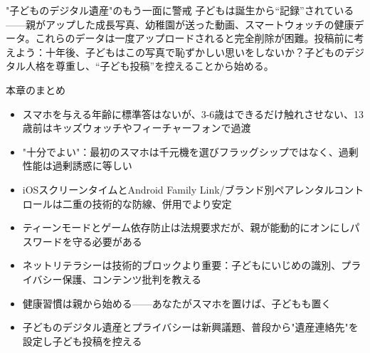 \begin{tcbwarn}{"子どものデジタル遺産"のもう一面に警戒}
子どもは誕生から“記録”されている——親がアップした成長写真、幼稚園が送った動画、スマートウォッチの健康データ。これらのデータは一度アップロードされると完全削除が困難。投稿前に考えよう：十年後、子どもはこの写真で恥ずかしい思いをしないか？子どものデジタル人格を尊重し、“子ども投稿”を控えることから始める。

\end{tcbwarn}

\begin{tcbsummary}{本章のまとめ}
\begin{itemize}
  \item スマホを与える年齢に標準答はないが、3-6歳はできるだけ触れさせない、13歳前はキッズウォッチやフィーチャーフォンで過渡
  \item "十分でよい"：最初のスマホは千元機を選びフラッグシップではなく、過剰性能は過剰誘惑に等しい
  \item iOSスクリーンタイムとAndroid Family Link/ブランド別ペアレンタルコントロールは二重の技術的な防線、併用でより安定
  \item ティーンモードとゲーム依存防止は法規要求だが、親が能動的にオンにしパスワードを守る必要がある
  \item ネットリテラシーは技術的ブロックより重要：子どもにいじめの識別、プライバシー保護、コンテンツ批判を教える
  \item 健康習慣は親から始める——あなたがスマホを置けば、子どもも置く
  \item 子どものデジタル遺産とプライバシーは新興議題、普段から"遺産連絡先"を設定し子ども投稿を控える
\end{itemize}

\end{tcbsummary}
